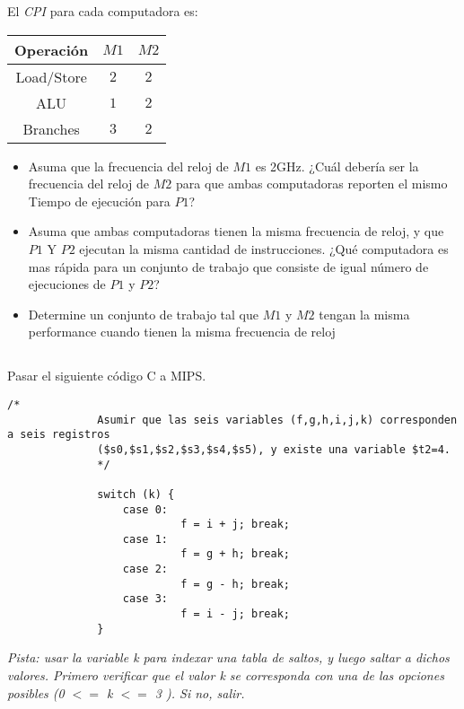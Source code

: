             El \textit{CPI} para cada computadora es:
            \begin{center}
            \begin{tabular}{||c|c|c||}
            \hline
            Operación & $M1$ & $M2$ \\
            \hline
            Load/Store & $2$ & $2$ \\
            \hline
            ALU        & $1$ & $2$ \\
            \hline
            Branches   & $3$ & $2$ \\
            \hline
            \end{tabular}
            \end{center}

            \begin{itemize}
            \item Asuma que la frecuencia del reloj de $M1$ es 2GHz. ¿Cuál debería ser la frecuencia del reloj de $M2$ para que ambas
            computadoras reporten el mismo Tiempo de ejecución para $P1$?

            \item Asuma que ambas computadoras tienen la misma frecuencia de reloj, y que  $P1$ Y $P2$ ejecutan la misma cantidad de instrucciones.
            ¿Qué computadora es mas rápida para un conjunto de trabajo que consiste de igual número de ejecuciones de $P1$ y $P2$?

            \item Determine un conjunto de trabajo tal que $M1$ y $M2$ tengan la misma performance cuando tienen la misma frecuencia de reloj

            \end{itemize}
\subsection{}
      Pasar el siguiente código C a MIPS.
      \begin{small}
          \begin{lstlisting}[style=6620C]
              /*
              Asumir que las seis variables (f,g,h,i,j,k) corresponden a seis registros 
              ($s0,$s1,$s2,$s3,$s4,$s5), y existe una variable $t2=4.
              */
               
              switch (k) {
                  case 0:
                           f = i + j; break; 
                  case 1:
                           f = g + h; break;
                  case 2:
                           f = g - h; break; 
                  case 3:
                           f = i - j; break; 
              }
          \end{lstlisting}
      \end{small}
      \textit{Pista: usar la variable k para indexar una tabla de saltos, y luego 
      saltar a dichos valores.
      Primero verificar que el valor k se corresponda con una de las opciones posibles
      (0 \(<=\) k \(<=\) 3 ). Si no, salir.}
     \vfill    

